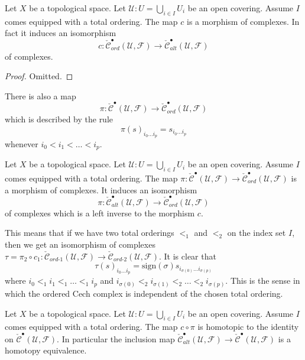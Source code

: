 \begin{lemma}
\label{lemma-ordered-alternating}
Let $X$ be a topological space.
Let $\mathcal{U} : U = \bigcup_{i \in I} U_i$ be an open covering.
Assume $I$ comes equipped with a total ordering.
The map $c$ is a morphism of complexes. In fact it induces
an isomorphism
$$
c : \check{\mathcal{C}}_{ord}^\bullet(\mathcal{U}, \mathcal{F})
\to \check{\mathcal{C}}_{alt}^\bullet(\mathcal{U}, \mathcal{F})
$$
of complexes.
\end{lemma}

\begin{proof}
Omitted.
\end{proof}

\noindent
There is also a map
$$
\pi :
\check{\mathcal{C}}^\bullet(\mathcal{U}, \mathcal{F})
\longrightarrow
\check{\mathcal{C}}_{ord}^\bullet(\mathcal{U}, \mathcal{F})
$$
which is described by the rule
$$
\pi(s)_{i_0\ldots i_p} = s_{i_0\ldots i_p}
$$
whenever $i_0 < i_1 < \ldots < i_p$.

\begin{lemma}
\label{lemma-project-to-ordered}
Let $X$ be a topological space.
Let $\mathcal{U} : U = \bigcup_{i \in I} U_i$ be an open covering.
Assume $I$ comes equipped with a total ordering.
The map $\pi : \check{\mathcal{C}}^\bullet(\mathcal{U}, \mathcal{F})
\to \check{\mathcal{C}}_{ord}^\bullet(\mathcal{U}, \mathcal{F})$
is a morphism of complexes. It induces an isomorphism
$$
\pi : \check{\mathcal{C}}_{alt}^\bullet(\mathcal{U}, \mathcal{F})
\to \check{\mathcal{C}}_{ord}^\bullet(\mathcal{U}, \mathcal{F})
$$
of complexes which is a left inverse to the morphism $c$.
\end{lemma}

\begin{remark}
\label{remark-compared-ordered-complexes}
This means that if we have two total orderings $<_1$ and $<_2$ on
the index set $I$, then we get an isomorphism of complexes
$\tau = \pi_2 \circ c_1 :
\check{\mathcal{C}}_{ord\text{-}1}(\mathcal{U}, \mathcal{F}) \to
\check{\mathcal{C}}_{ord\text{-}2}(\mathcal{U}, \mathcal{F})$.
It is clear that
$$
\tau(s)_{i_0 \ldots i_p} =
\text{sign}(\sigma) s_{i_{\sigma(0)} \ldots i_{\sigma(p)}}
$$
where $i_0 <_1 i_1 <_1 \ldots <_1 i_p$ and
$i_{\sigma(0)} <_2 i_{\sigma(1)} <_2 \ldots <_2 i_{\sigma(p)}$.
This is the sense in which the ordered Cech complex is independent
of the chosen total ordering.
\end{remark}

\begin{lemma}
\label{lemma-alternating-usual}
Let $X$ be a topological space.
Let $\mathcal{U} : U = \bigcup_{i \in I} U_i$ be an open covering.
Assume $I$ comes equipped with a total ordering.
The map $c \circ \pi$ is homotopic to the identity on
$\check{\mathcal{C}}^\bullet(\mathcal{U}, \mathcal{F})$.
In particular the inclusion map
$\check{\mathcal{C}}_{alt}^\bullet(\mathcal{U}, \mathcal{F}) \to
\check{\mathcal{C}}^\bullet(\mathcal{U}, \mathcal{F})$
is a homotopy equivalence.
\end{lemma}

